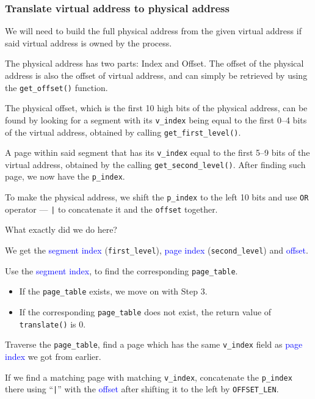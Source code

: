\documentclass[a4paper]{article}
\numberwithin{equation}{section}
\begin{document}
\subsubsection{Translate virtual address to physical address}
We will need to build the full physical address from the given virtual address if said virtual address is owned by the process.

The physical address has two parts: Index and Offset.
The offset of the physical address is also the offset of virtual address, and can simply be retrieved by using the \texttt{get_offset()} function.

The physical offset, which is the first 10 high bits of the physical address, can be found by looking for a segment with its \texttt{v_index} being equal to the first 0--4 bits of the virtual address, obtained by calling \texttt{get_first_level()}.

A page within said segment that has its \texttt{v_index} equal to the first 5--9 bits of the virtual address, obtained by the calling \texttt{get_second_level()}.
After finding such page, we now have the \texttt{p_index}.

To make the physical address, we shift the \texttt{p_index} to the left 10 bits and use \texttt{OR} operator --- \texttt{|} to concatenate it and the \texttt{offset} together.

What exactly did we do here?
\begin{steps}
  \item We get the \textcolor{blue}{segment index} (\texttt{first_level}), \textcolor{blue}{page index} (\texttt{second_level}) and \textcolor{blue}{offset}.
  \item Use the \textcolor{blue}{segment index}, to find the corresponding \texttt{page_table}.
  \begin{itemize}
    \item If the \texttt{page_table} exists, we move on with Step 3.
    \item If the corresponding \texttt{page_table} does not exist, the return value of \texttt{translate()} is 0.
  \end{itemize}

  \item Traverse the \texttt{page_table}, find a page which has the same \texttt{v_index} field as \textcolor{blue}{page index} we got from earlier.
  \item If we find a matching page with matching \texttt{v_index}, concatenate the \texttt{p_index} there using ``\texttt{|}'' with the \textcolor{blue}{offset} after shifting it to the left by \texttt{OFFSET_LEN}.
\end{steps}
\end{document}

